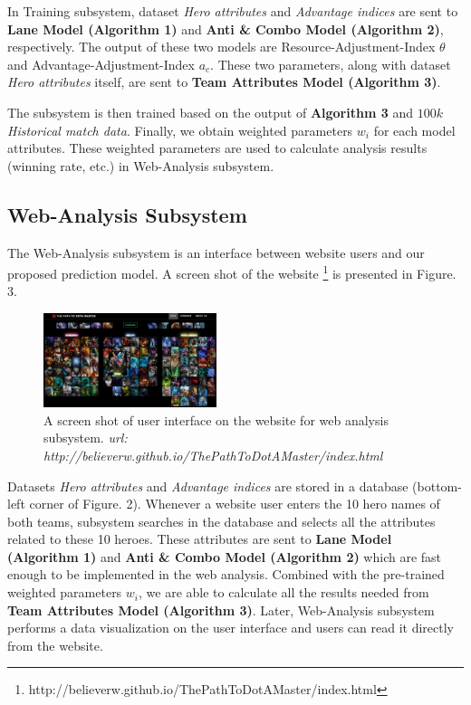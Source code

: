 \documentclass[letterpaper, 10 pt, conference]{ieeeconf}  %
\begin{document}
In Training subsystem, dataset \textit{Hero attributes} and \textit{Advantage indices} are sent to \textbf{Lane Model (Algorithm 1)} and \textbf{Anti \& Combo Model (Algorithm 2)}, respectively. The output of these two models are Resource-Adjustment-Index $\theta$ and Advantage-Adjustment-Index $a_c$. These two parameters, along with dataset \textit{Hero attributes} itself, are sent to \textbf{Team Attributes Model (Algorithm 3)}. 

The subsystem is then trained based on the output of \textbf{Algorithm 3} and $100k$ \textit{Historical match data}. Finally, we obtain weighted parameters $w_i$ for each model attributes. These weighted parameters are used to calculate analysis results (winning rate, etc.) in Web-Analysis subsystem.

\subsection{Web-Analysis Subsystem}

The Web-Analysis subsystem is an interface between website users and our proposed prediction model. A screen shot of the website \footnote{http://believerw.github.io/ThePathToDotAMaster/index.html} is presented in Figure. 3.
\begin{figure}[h]
\begin{center}
\includegraphics[width=0.45\textwidth]{pick.jpg}
\caption{A screen shot of user interface on the website for web analysis subsystem. \textit{url: http://believerw.github.io/ThePathToDotAMaster/index.html}}
\end{center}
\end{figure}

Datasets \textit{Hero attributes} and \textit{Advantage indices} are stored in a database (bottom-left corner of Figure. 2). Whenever a website user enters the 10 hero names of both teams, subsystem searches in the database and selects all the attributes related to these 10 heroes. These attributes are sent to \textbf{Lane Model (Algorithm 1)} and \textbf{Anti \& Combo Model (Algorithm 2)} which are fast enough to be implemented in the web analysis. Combined with the pre-trained weighted parameters $w_i$, we are able to calculate all the results needed from \textbf{Team Attributes Model (Algorithm 3)}. Later, Web-Analysis subsystem performs a data visualization on the user interface and users can read it directly from the website.
\end{document}
